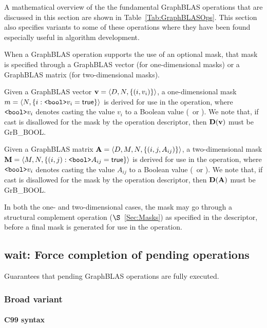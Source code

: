 A mathematical overview of the the fundamental GraphBLAS operations that are
discussed in this section are shown in Table~\ref{Tab:GraphBLASOps}.  This
section also specifies variants to some of these operations where they have
been found especially useful in algorithm development.

When a GraphBLAS operation supports the use of an optional mask, that mask is
specified through a GraphBLAS vector (for one-dimensional masks) or
a GraphBLAS matrix (for two-dimensional masks).

Given a GraphBLAS vector ${\bf v} = \langle D,N, \{ (i,v_i) \} \rangle$, a
one-dimensional mask $m = \langle N, \{ i : \mbox{\tt <bool>}v_i = {\sf true} \} \rangle$
is derived for use in the operation, where $\mbox{\tt <bool>}v_i$ denotes
casting the value $v_i$ to a Boolean value (\true\ or \false).
We note that, if cast is disallowed for the mask by the operation descriptor, then
$\bold{D}({\bf v})$ must be {\sf GrB\_BOOL}.

Given a GraphBLAS matrix ${\bf A} = \langle D, M, N, \{ (i,j,A_{ij}) \} \rangle$,
a two-dimensional mask ${\bf M} = \langle M,N, \{ (i,j) : \mbox{\tt <bool>}A_{ij} = {\sf true} \} \rangle$
is derived for use in the operation, where $\mbox{\tt <bool>}v_i$ denotes
casting the value $A_{ij}$ to a Boolean value (\true\ or \false).
We note that, if cast is disallowed for the mask by the operation descriptor, then
$\bold{D}({\bf A})$ must be {\sf GrB\_BOOL}.

In both the one- and two-dimensional cases, the mask may go through a structural
complement operation ($\S$~\ref{Sec:Masks}) as specified in the descriptor, before a final
mask is generated for use in the operation.

\subsection{{\sf wait}: Force completion of pending operations}
\label{Sec:wait}


Guarantees that pending GraphBLAS operations are fully executed.

\subsubsection{Broad variant}

\paragraph{C99 syntax}

